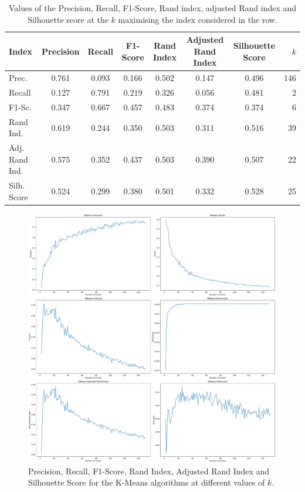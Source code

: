 \documentclass[a4paper]{article}
\begin{document}
	\begin{table}[H]
		\centering
		\begin{tabular}{l*{6}{c}r}
			Index              & Precision & Recall & F1-Score & Rand Index & Adjusted Rand Index  & Silhouette Score & $k$ \\
			\hline
			Prec. 		& 0.761 & 0.093 & 0.166 & 0.502 & 0.147 & 0.496 & 146  \\
			Recall          & 0.127 & 0.791 & 0.219 & 0.326 &  0.056 & 0.481 &  2  \\
			F1-Sc.        & 0.347 & 0.667 & 0.457 & 0.483 &  0.374 & 0.374 &  6  \\
			Rand Ind.      & 0.619 & 0.244 & 0.350 & 0.503 &  0.311 & 0.516 &  39  \\
			Adj. Rand Ind. & 0.575 & 0.352 & 0.437 & 0.503 &  0.390 & 0.507 &  22  \\
			Silh. Score & 0.524 & 0.299 & 0.380 & 0.501 &  0.332 & 0.528 &  25  \\
		\end{tabular}
	\caption{Values of the Precision, Recall, F1-Score, Rand index, adjusted Rand index and Silhouette score at the $k$ maximising the index considered in the row.}
	\label{table:kmeans}
	\end{table}

	\begin{figure}[H]
		\includegraphics[width=\linewidth]{kmeans_indeces.pdf}
		\caption{Precision, Recall, F1-Score, Rand Index, Adjusted Rand Index and Silhouette Score for the K-Means algorithms at different values of $k$.}
		\label{fig:kmeans}
	\end{figure}
\end{document}
